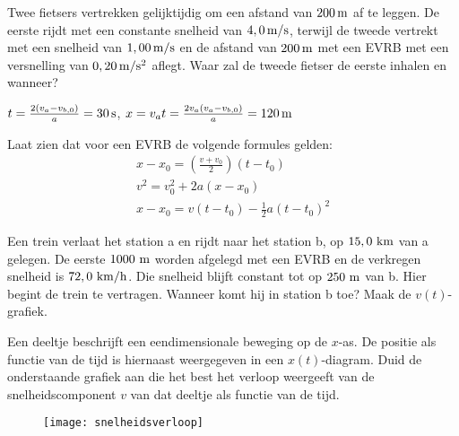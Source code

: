 \begin{exercise} Twee fietsers vertrekken gelijktijdig om
een afstand van $200\rm\,m$ af te leggen. De eerste rijdt met een
constante snelheid van $4,0\rm\,m/s$, terwijl de tweede vertrekt met
een snelheid van $1,00\rm\,m/s$ en de afstand van $200\rm\,m$ met
een EVRB met een versnelling van $0,20\rm\,m/s^2$ aflegt. Waar zal
de tweede fietser de eerste inhalen en wanneer?
\begin{oplossing}
\newline
$t=\frac{2(v_a-v_{b,0})}{a}=30\rm\,s$,
$x=v_at=\frac{2v_a(v_a-v_{b,0})}{a}=120\rm\,m$
\end{oplossing}

\end{exercise}

\begin{exercise} Laat zien dat voor een EVRB de volgende formules gelden:
\begin{eqnarray*}
x-x_0=\left(\frac{v+v_0}{2}\right)(t-t_0)\\
v^2=v_0^2+2a(x-x_0)\\
x-x_0=v(t-t_0)-\frac{1}{2}a(t-t_0)^2
\end{eqnarray*}

\end{exercise}

\begin{exercise} Een trein verlaat het station a en rijdt
naar het station b, op $15,0~\rm km$ van a gelegen. De eerste
$1000~\rm m$ worden afgelegd met een EVRB en de verkregen snelheid
is $72,0~\rm km/h$. Die snelheid blijft constant tot op $250~\rm m$
van b. Hier begint de trein te vertragen. Wanneer komt hij in
station b toe? Maak de $v(t)$-grafiek.










\end{exercise}

\begin{exercise} 
\begin{minipage}[t]{0.5\textwidth}
Een deeltje beschrijft een eendimensionale beweging op de $x$-as. De positie als functie van de tijd is hiernaast weergegeven in een $x(t)$-diagram. Duid de onderstaande grafiek aan die het best het verloop weergeeft van de snelheidscomponent $v$ van dat deeltje als functie van de tijd. 
\end{minipage}
\hspace{0.1\textwidth}
\begin{minipage}[t]{0.3\textwidth}
\end{minipage}
\begin{figure}[h]
\begin{flushright}
\texttt{[image: snelheidsverloop]}
\end{flushright}
\end{figure}

\end{exercise}

